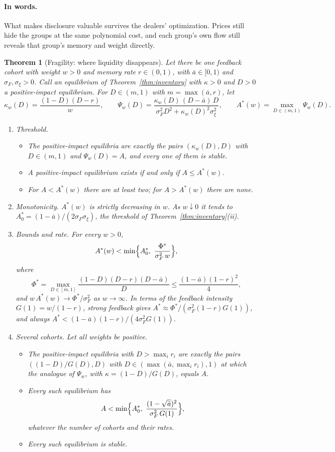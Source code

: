 \documentclass[12pt]{article}
\newtheorem{theorem}{Theorem}[section]
\theoremstyle{definition}
\theoremstyle{remark}
\begin{document}
\paragraph{In words.} What makes disclosure valuable survives the dealers' optimization. Prices still hide the groups at the same polynomial cost, and each group's own flow still reveals that group's memory and weight directly.

\begin{theorem}[Fragility: where liquidity disappears]\label{thm:fragility}
Let there be one feedback cohort with weight $w>0$ and memory rate $r\in(0,1)$, with $\bar a\in[0,1)$ and $\sigma_F,\sigma_\xi>0$. Call an equilibrium of Theorem~\ref{thm:inventory} with $\kappa>0$ and $D>0$ a positive-impact equilibrium. For $D\in(m,1)$ with $m=\max(\bar a,r)$, let
\[
 \kappa_w(D)=\frac{(1-D)(D-r)}{w},\qquad \Psi_w(D)=\frac{\kappa_w(D)\,(D-\bar a)\,D}{\sigma_F^2D^2+\kappa_w(D)^2\sigma_\xi^2},\qquad A^*(w)=\max_{D\in(m,1)}\Psi_w(D).
\]
\begin{enumerate}[label=(\roman*),itemsep=1pt]
\item \emph{Threshold.}
 \begin{itemize}[itemsep=1pt,topsep=2pt]
 \item The positive-impact equilibria are exactly the pairs $(\kappa_w(D),D)$ with $D\in(m,1)$ and $\Psi_w(D)=A$, and every one of them is stable.
 \item A positive-impact equilibrium exists if and only if $A\le A^*(w)$.
 \item For $A<A^*(w)$ there are at least two; for $A>A^*(w)$ there are none.
 \end{itemize}
\item \emph{Monotonicity.} $A^*(w)$ is strictly decreasing in $w$. As $w\downarrow0$ it tends to $A^*_0=(1-\bar a)/(2\sigma_F\sigma_\xi)$, the threshold of Theorem~\ref{thm:inventory}(ii).
\item \emph{Bounds and rate.} For every $w>0$,
\[
 A^*(w)<\min\Bigl\{A^*_0,\ \frac{\Phi^*}{\sigma_F^2\,w}\Bigr\},
\]
 where
\[
 \Phi^*=\max_{D\in[m,1]}\frac{(1-D)(D-r)(D-\bar a)}{D}\le\frac{(1-\bar a)(1-r)^2}{4},
\]
 and $w\,A^*(w)\to\Phi^*/\sigma_F^2$ as $w\to\infty$. In terms of the feedback intensity $G(1)=w/(1-r)$, strong feedback gives $A^*\approx\Phi^*/(\sigma_F^2(1-r)G(1))$, and always $A^*<(1-\bar a)(1-r)/(4\sigma_F^2G(1))$.
\item \emph{Several cohorts.} Let all weights be positive.
 \begin{itemize}[itemsep=1pt,topsep=2pt]
 \item The positive-impact equilibria with $D>\max_ir_i$ are exactly the pairs $((1-D)/G(D),D)$ with $D\in(\max(\bar a,\max_ir_i),1)$ at which the analogue of $\Psi_w$, with $\kappa=(1-D)/G(D)$, equals $A$.
 \item Every such equilibrium has
 \[
  A<\min\Bigl\{A^*_0,\ \frac{(1-\sqrt{\bar a})^2}{\sigma_F^2\,G(1)}\Bigr\},
 \]
 whatever the number of cohorts and their rates.
 \item Every such equilibrium is stable.
 \end{itemize}
\end{enumerate}
\end{theorem}
\end{document}
